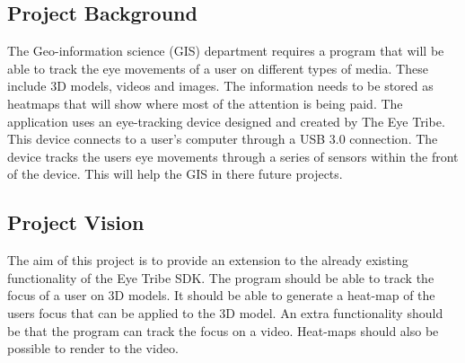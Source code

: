 \subsection{Project Background}
The Geo-information science (GIS) department requires a program that will be able to track the eye movements of a user on different types of media. These include 3D models, videos and images. The information needs to be stored as heatmaps that will show where most of the attention is being paid. The application uses an eye-tracking device designed and created by The Eye Tribe. This device connects to a user's computer through a USB 3.0 connection. The device tracks the users eye movements through a series of sensors within the front of the device. This will help the GIS in there future projects.

\subsection{Project Vision}
The aim of this project is to provide an extension to the already existing functionality of the Eye Tribe SDK. The program should be able to track the focus of a user on 3D models. It should be able to generate a heat-map of the users focus that can be applied to the 3D model. An extra functionality should be that the program can track the focus on a video. Heat-maps should also be possible to render to the video.
